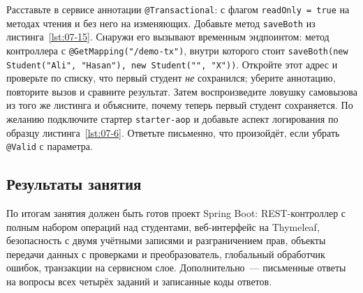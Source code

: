 Расставьте в сервисе аннотации \texttt{@Transactional}: с флагом
\texttt{readOnly = true} на методах чтения и без него на изменяющих. Добавьте
метод \texttt{saveBoth} из листинга~\ref{lst:07-15}. Снаружи его вызывают
временным эндпоинтом: метод контроллера с \texttt{@GetMapping("/demo-tx")},
внутри которого стоит
\texttt{saveBoth(new Student("Ali", "Hasan"), new Student("", "X"))}.
Откройте этот адрес и проверьте по списку, что первый студент \emph{не}
сохранился; уберите аннотацию, повторите вызов и сравните результат. Затем
воспроизведите ловушку самовызова из того же листинга и объясните, почему
теперь первый студент сохраняется. По желанию подключите стартер
\texttt{starter-aop} и добавьте аспект логирования по образцу
листинга~\ref{lst:07-6}. Ответьте письменно, что произойдёт, если убрать
\texttt{@Valid} с параметра.

\subsection*{Результаты занятия}

По итогам занятия должен быть готов проект Spring Boot: REST-контроллер с
полным набором операций над студентами, веб-интерфейс на Thymeleaf,
безопасность с двумя учётными записями и разграничением прав, объекты
передачи данных с проверками и преобразователь, глобальный обработчик ошибок,
транзакции на сервисном слое. Дополнительно~--- письменные ответы на вопросы
всех четырёх заданий и записанные коды ответов.

\kontrolvoprosy

